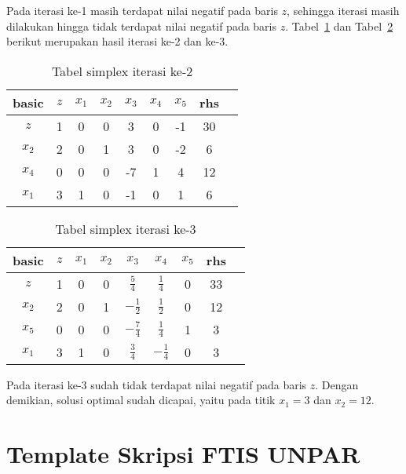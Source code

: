 \begin{enumerate}
		Pada iterasi ke-1 masih terdapat nilai negatif pada baris $z$, sehingga iterasi masih dilakukan hingga tidak terdapat nilai negatif pada baris $z$. Tabel~\ref{tab:contoh_simplex_iterasi_2} dan Tabel~\ref{tab:contoh_simplex_iterasi_3} berikut merupakan hasil iterasi ke-2 dan ke-3.
			
		\begin{table}[H]
			\centering
			\caption{Tabel simplex iterasi ke-2}
			\label{tab:contoh_simplex_iterasi_2}
			\begin{tabular}{|c|c|c c c c c|c|c}
				\hline
			 	basic & $z$ & $x_1$ & $x_2$ & $x_3$ & $x_4$ & $x_5$ & rhs \\
				\hline
				$z$ & 1 & 0 & 0 & 3 & 0 & -1 & 30 \\
				\hline
				$x_2$ & 2 & 0 & 1 & 3 & 0 & -2 & 6 \\
				$x_4$ & 0 & 0 & 0 & -7 & 1 & 4 & 12 \\
				$x_1$ & 3 & 1 & 0 & -1 & 0 & 1 & 6 \\
				\hline
			\end{tabular}
		\end{table}

		\begin{table}[H]
			\centering
			\caption{Tabel simplex iterasi ke-3}
			\label{tab:contoh_simplex_iterasi_3}
			\begin{tabular}{|c|c|c c c c c|c|c}
				\hline
			 	basic & $z$ & $x_1$ & $x_2$ & $x_3$ & $x_4$ & $x_5$ & rhs \\
				\hline
				$z$ & 1 & 0 & 0 & $\frac{5}{4}$ & $\frac{1}{4}$ & 0 & 33 \\
				\hline
				$x_2$ & 2 & 0 & 1 & $-\frac{1}{2}$ & $\frac{1}{2}$ & 0 & 12 \\
				$x_5$ & 0 & 0 & 0 & $-\frac{7}{4}$& $\frac{1}{4}$ & 1 & 3 \\
				$x_1$ & 3 & 1 & 0 & $\frac{3}{4}$ & $-\frac{1}{4}$ & 0 & 3 \\
				\hline
			\end{tabular}
		\end{table}

		Pada iterasi ke-3 sudah tidak terdapat nilai negatif pada baris $z$. Dengan demikian, solusi optimal sudah dicapai, yaitu pada titik $x_1 = 3$ dan $x_2=12$.

\end{enumerate}

\section{Template Skripsi FTIS UNPAR}
\label{sec:template}
 
